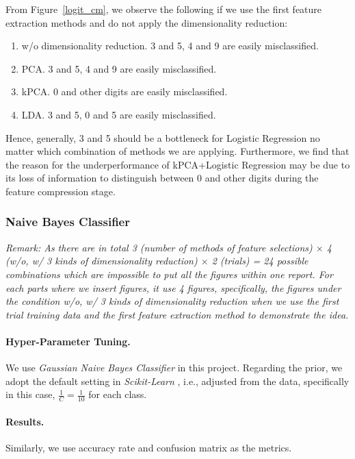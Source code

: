 \documentclass{article}
\begin{document}
From Figure~\ref{logit_cm}, we observe the following if we use the first feature extraction methods and do not apply the dimensionality reduction:
\begin{enumerate}
    \item w/o dimensionality reduction. 3 and 5, 4 and 9 are easily misclassified.
    \item PCA. 3 and 5, 4 and 9 are easily misclassified.
    \item kPCA. 0 and other digits are easily misclassified.
    \item LDA. 3 and 5, 0 and 5 are easily misclassified.
\end{enumerate}

Hence, generally, 3 and 5 should be a bottleneck for Logistic Regression no matter which combination of methods we are applying. Furthermore, we find that the reason for the underperformance of kPCA+Logistic Regression may be due to its loss of information to distinguish between 0 and other digits during the feature compression stage.

\subsubsection{Naive Bayes Classifier}
\emph{Remark: As there are in total 3 (number of methods of feature selections) $\times$ 4 (w/o, w/ 3 kinds of dimensionality reduction) $\times$ 2 (trials) = 24 possible combinations which are impossible to put all the figures within one report. For each parts where we insert figures, it use 4 figures, specifically, the figures under the condition w/o, w/ 3 kinds of dimensionality reduction when we use the first trial training data and the first feature extraction method to demonstrate the idea.}

\paragraph{Hyper-Parameter Tuning.}
We use \emph{Gaussian Naive Bayes Classifier} in this project. Regarding the prior, we adopt the default setting in \emph{Scikit-Learn} \cite{pedregosa2011scikit}, i.e., adjusted from the data, specifically in this case, $\frac{1}{C} = \frac{1}{10}$ for each class.

\paragraph{Results.}
Similarly, we use accuracy rate and confusion matrix as the metrics.
\end{document}
